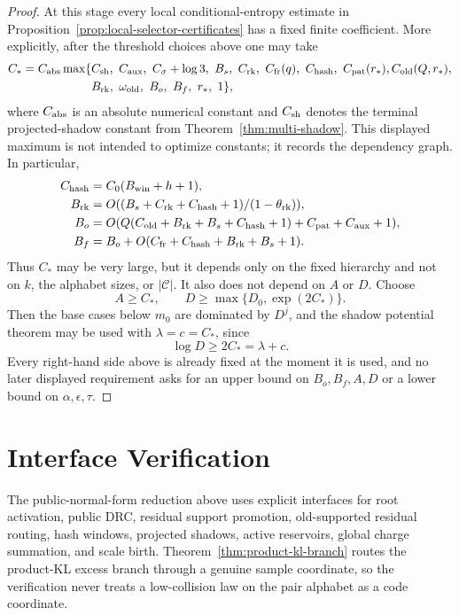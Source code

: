 \documentclass[11pt]{article}
\newcommand{\C}{\mathcal C}
\begin{document}
\begin{proof}
At this stage every local conditional-entropy estimate in
Proposition~\ref{prop:local-selector-certificates}
has a fixed finite coefficient.  More explicitly, after the threshold choices
above one may take
\[
\begin{aligned}
  C_*
  = C_{\rm abs}\max\{&
  C_{\rm sh},\ C_{\rm aux},\ C_\sigma+\log 3,\ B_s,\ 
  C_{\rm rk},\ C_{\rm fr}(q),\ C_{\rm hash},\ C_{\rm pat}(r_*),
  C_{\rm old}(Q,r_*),\\
  &B_{\rm rk},\ \omega_{\rm old},\ B_o,\ B_f,\ r_*,\ 1\},
\end{aligned}
\]
where $C_{\rm abs}$ is an absolute numerical constant and $C_{\rm sh}$ denotes
the terminal projected-shadow constant from
Theorem~\ref{thm:multi-shadow}.  This displayed maximum is not intended to
optimize constants; it records the dependency graph.  In particular,
\begin{align*}
  C_{\rm hash}&=C_0(B_{\rm win}+h+1),\\
  B_{\rm rk}&=O((B_s+C_{\rm rk}+C_{\rm hash}+1)/(1-\theta_{\rm rk})),\\
  B_o&=O(Q(C_{\rm old}+B_{\rm rk}+B_s+C_{\rm hash}+1)
    +C_{\rm pat}+C_{\rm aux}+1),\\
  B_f&=B_o+O(C_{\rm fr}+C_{\rm hash}+B_{\rm rk}+B_s+1).
\end{align*}
Thus $C_*$ may be very large, but it depends only on the fixed hierarchy and
not on $k$, the alphabet sizes, or $|\C|$.  It also does not depend on $A$ or
$D$.  Choose
\[
  A\ge C_*,
  \qquad
  D\ge \max\{D_0,\exp(2C_*)\}.
\]
Then the base cases below $m_0$ are dominated by $D^j$, and the shadow
potential theorem may be used with $\lambda=c=C_*$, since
\[
  \log D\ge 2C_*=\lambda+c .
\]
Every right-hand side above is already fixed at the moment it is used, and no
later displayed requirement asks for an upper bound on $B_o,B_f,A,D$ or a
lower bound on $\alpha,\epsilon,\tau$.
\end{proof}

\section{Interface Verification}

The public-normal-form reduction above uses explicit interfaces for root
activation, public DRC, residual support promotion, old-supported residual
routing, hash windows, projected shadows, active reservoirs, global charge
summation, and scale birth.  Theorem~\ref{thm:product-kl-branch}
routes the product-KL excess branch through a genuine sample coordinate, so
the verification never treats a low-collision law on the pair alphabet as a code
coordinate.
\end{document}
